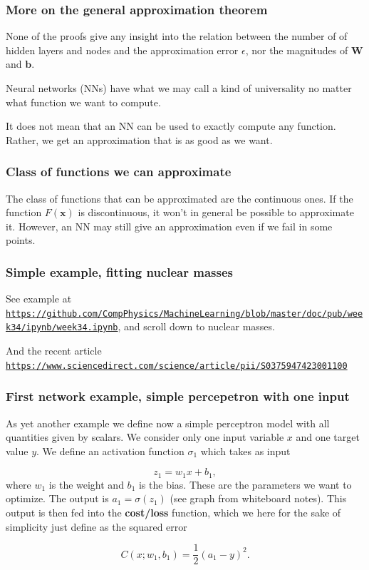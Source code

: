 \documentclass{beamer}
\begin{document}
\begin{frame}
\frametitle{More on the general approximation theorem}

None of the proofs give any insight into the relation between the
number of of hidden layers and nodes and the approximation error
$\epsilon$, nor the magnitudes of $\bm{W}$ and $\bm{b}$.

Neural networks (NNs) have what we may call a kind of universality no matter what function we want to compute.

\begin{block}{}
It does not mean that an NN can be used to exactly compute any function. Rather, we get an approximation that is as good as we want. 
\end{block}
\end{frame}

\begin{frame}
\frametitle{Class of functions we can approximate}

\begin{block}{}
The class of functions that can be approximated are the continuous ones.
If the function $F(\bm{x})$ is discontinuous, it won't in general be possible to approximate it. However, an NN may still give an approximation even if we fail in some points.
\end{block}
\end{frame}

\begin{frame}
\frametitle{Simple example, fitting nuclear masses}

See example at \href{{https://github.com/CompPhysics/MachineLearning/blob/master/doc/pub/week34/ipynb/week34.ipynb}}{\nolinkurl{https://github.com/CompPhysics/MachineLearning/blob/master/doc/pub/week34/ipynb/week34.ipynb}}, and scroll down to nuclear masses.

And the recent article \href{{https://www.sciencedirect.com/science/article/pii/S0375947423001100}}{\nolinkurl{https://www.sciencedirect.com/science/article/pii/S0375947423001100}}
\end{frame}

\begin{frame}
\frametitle{First network example, simple percepetron with one input}

As yet another example we define now a simple perceptron model with
all quantities given by scalars. We consider only one input variable
$x$ and one target value $y$.  We define an activation function
$\sigma_1$ which takes as input

\[
z_1 = w_1x+b_1,
\]
where $w_1$ is the weight and $b_1$ is the bias. These are the
parameters we want to optimize.  The output is $a_1=\sigma(z_1)$ (see
graph from whiteboard notes). This output is then fed into the
\textbf{cost/loss} function, which we here for the sake of simplicity just
define as the squared error

\[
C(x;w_1,b_1)=\frac{1}{2}(a_1-y)^2.
\]
\end{frame}
\end{document}
